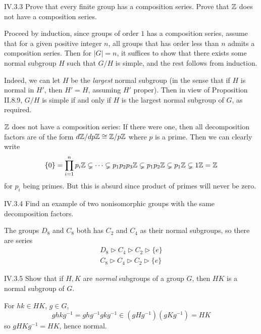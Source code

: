 \begin{problem}{IV.3.3}
Prove that every finite group has a composition series. Prove that $\mathbb{Z}$ does not have a composition series. 
\end{problem}
\begin{pf}
Proceed by induction, since groups of order $1$ has a composition series, assume that for a given positive integer $n$, all groups that has order less than $n$ admits a composition series. Then for $|G|=n$, it suffices to show that there exists some normal subgroup $H$ such that $G/H$ is simple, and the rest follows from induction. 

Indeed, we can let $H$ be the \emph{largest} normal subgroup (in the sense that if $H$ is normal in $H'$, then $H' = H$, assuming $H'$ proper). Then in view of Proposition II.8.9, $G/H$ is simple if and only if $H$ is the largest normal subgroup of $G$, as required.

$\mathbb{Z}$ does not have a composition series: If there were one, then all decomposition factors are of the form $d\mathbb{Z}/dp\mathbb{Z} \cong \mathbb{Z}/p\mathbb{Z}$ where $p$ is a prime. Then we can clearly write 
\[
\{0\} = \prod_{i = 1}^n p_i\mathbb{Z} \subsetneq \cdots \subsetneq p_1p_2p_3\mathbb{Z}  \subsetneq p_1p_2\mathbb{Z} \subsetneq p_1\mathbb{Z} \subsetneq 1\mathbb{Z} = \mathbb{Z}
\]
for $p_i$ being primes. But this is absurd since product of primes will never be zero.
\end{pf}

\begin{problem}{IV.3.4}
Find an example of two nonisomorphic groups with the same decomposition factors.
\end{problem}
\begin{sol}
The groups $D_8$ and $C_8$ both has $C_2$ and $C_4$ as their normal subgroups, so there are series 
\begin{align*}
D_8 \triangleright C_4 \triangleright C_2 \triangleright \{e\} \\
C_8 \triangleright C_4 \triangleright C_2 \triangleright \{e\}
\end{align*}
\end{sol}

\begin{problem}{IV.3.5}
Show that if $H, K$ are \emph{normal} subgroups of a group $G$, then $HK$ is a normal subgroup of $G$. 
\end{problem} 
\begin{pf}
For $hk \in HK$, $g \in G$,
\[
ghkg^{-1} = ghg^{-1}gkg^{-1} \in (gHg^{-1})(gKg^{-1}) = HK
\]
so $gHKg^{-1} = HK$, hence normal.
\end{pf}

